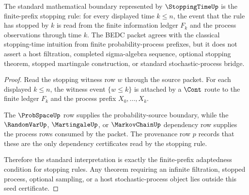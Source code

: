 \begin{theorem}
\label{thm:stoppingtime-standard-boundary}
The standard mathematical boundary represented by $\StoppingTimeUp$ is the
finite-prefix stopping rule: for every displayed time $k\leq n$, the event
that the rule has stopped by $k$ is read from the finite information ledger
$F_k$ and the process observations through time $k$. The BEDC packet agrees
with the classical stopping-time intuition from finite probability-process
prefixes, but it does not assert a host filtration, completed sigma-algebra
sequence, optional stopping theorem, stopped martingale construction, or
standard stochastic-process bridge.
\end{theorem}
\begin{proof}
Read the stopping witness row $w$ through the source packet. For each
displayed $k\leq n$, the witness event $\{w\leq k\}$ is attached by a $\Cont$
route to the finite ledger $F_k$ and the process prefix
$X_0,\ldots,X_k$.

The $\ProbSpaceUp$ row supplies the probability-source boundary, while the
$\RandomVarUp$, $\MartingaleUp$, or $\MarkovChainUp$ dependency row supplies
the process rows consumed by the packet. The provenance row $p$ records that
these are the only dependency certificates read by the stopping rule.

Therefore the standard interpretation is exactly the finite-prefix
adaptedness condition for stopping rules. Any theorem requiring an infinite
filtration, stopped process, optional sampling, or a host stochastic-process
object lies outside this seed certificate.
\end{proof}

